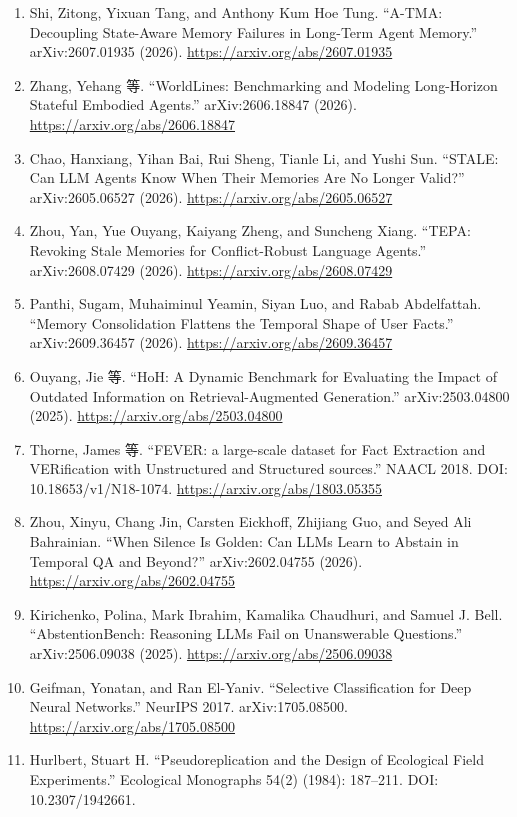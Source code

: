 \documentclass[UTF8,11pt]{ctexart}
\begin{document}
\begin{enumerate}[leftmargin=*,nosep]
\item Shi, Zitong, Yixuan Tang, and Anthony Kum Hoe Tung. ``A-TMA: Decoupling State-Aware Memory Failures in Long-Term Agent Memory.'' arXiv:2607.01935 (2026). \url{https://arxiv.org/abs/2607.01935}
\item Zhang, Yehang 等. ``WorldLines: Benchmarking and Modeling Long-Horizon Stateful Embodied Agents.'' arXiv:2606.18847 (2026). \url{https://arxiv.org/abs/2606.18847}
\item Chao, Hanxiang, Yihan Bai, Rui Sheng, Tianle Li, and Yushi Sun. ``STALE: Can LLM Agents Know When Their Memories Are No Longer Valid?'' arXiv:2605.06527 (2026). \url{https://arxiv.org/abs/2605.06527}
\item Zhou, Yan, Yue Ouyang, Kaiyang Zheng, and Suncheng Xiang. ``TEPA: Revoking Stale Memories for Conflict-Robust Language Agents.'' arXiv:2608.07429 (2026). \url{https://arxiv.org/abs/2608.07429}
\item Panthi, Sugam, Muhaiminul Yeamin, Siyan Luo, and Rabab Abdelfattah. ``Memory Consolidation Flattens the Temporal Shape of User Facts.'' arXiv:2609.36457 (2026). \url{https://arxiv.org/abs/2609.36457}
\item Ouyang, Jie 等. ``HoH: A Dynamic Benchmark for Evaluating the Impact of Outdated Information on Retrieval-Augmented Generation.'' arXiv:2503.04800 (2025). \url{https://arxiv.org/abs/2503.04800}
\item Thorne, James 等. ``FEVER: a large-scale dataset for Fact Extraction and VERification with Unstructured and Structured sources.'' NAACL 2018. DOI: 10.18653/v1/N18-1074. \url{https://arxiv.org/abs/1803.05355}
\item Zhou, Xinyu, Chang Jin, Carsten Eickhoff, Zhijiang Guo, and Seyed Ali Bahrainian. ``When Silence Is Golden: Can LLMs Learn to Abstain in Temporal QA and Beyond?'' arXiv:2602.04755 (2026). \url{https://arxiv.org/abs/2602.04755}
\item Kirichenko, Polina, Mark Ibrahim, Kamalika Chaudhuri, and Samuel J. Bell. ``AbstentionBench: Reasoning LLMs Fail on Unanswerable Questions.'' arXiv:2506.09038 (2025). \url{https://arxiv.org/abs/2506.09038}
\item Geifman, Yonatan, and Ran El-Yaniv. ``Selective Classification for Deep Neural Networks.'' NeurIPS 2017. arXiv:1705.08500. \url{https://arxiv.org/abs/1705.08500}
\item Hurlbert, Stuart H. ``Pseudoreplication and the Design of Ecological Field Experiments.'' Ecological Monographs 54(2) (1984): 187--211. DOI: 10.2307/1942661.

\end{enumerate}
\end{document}
